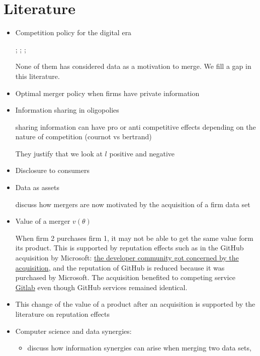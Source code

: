 \documentclass[a4paper,leqno]{article}%
\renewcommand{\t}{\theta}
\begin{document}
\section{Literature}
\begin{itemize}\setlength\itemsep{-1em}
    \item Competition policy for the digital era
    
    \cite{tirole2020competition}; \cite{scott2019committee}; \cite{cremer2019competition}; \cite{cabral2020merger}
    
    None of them has considered data as a motivation to merge. We fill a gap in this literature.
    
    \item Optimal merger policy when firms have private information \cite{Besanko1993}
    \item Information sharing in oligopolies
    
    \cite{vives1984duopoly, gal1986information} sharing information can have pro or anti competitive effects depending on the nature of competition (cournot vs bertrand)
    
    They justify that we look at $l$ positive and negative
    \item Disclosure to consumers 
    \item Data as assets
    
    \cite{stucke2016introduction} discuss how mergers are now motivated by the acquisition of a firm data set
    
    \item Value of a merger $v(\t)$
    
    When firm 2 purchases firm 1, it may not be able to get the same value form its product. This is supported by reputation effects such as in the GitHub acquisition by Microsoft: \href{https://www.theverge.com/2018/10/26/17954714/microsoft-github-deal-acquisition-complete}{the developer community got concerned by the acquisition}, and the reputation of GitHub is reduced because it was purchased by Microsoft. The acquisition benefited to competing service \href{https://www.itprotoday.com/linux/why-open-source-software-moving-gitlab-after-microsoft-github-deal}{Gitlab} even though GitHub services remained identical.
    
    \item This change of the value of a product after an acquisition is supported by the literature on reputation effects \citep{tadelis1999s}
    
    \item Computer science and data synergies:
\begin{itemize}
    \item \cite{bertschinger2014quantifying, Griffith2014, olbrich2015information} discuss how information synergies can arise when merging two data sets, 
    

\end{itemize}
\end{itemize}
\end{document}
